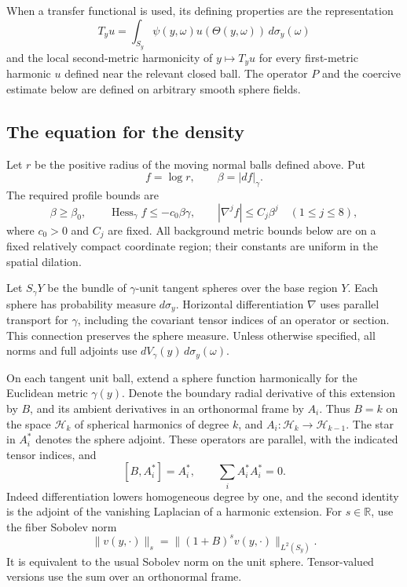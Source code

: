 \documentclass[11pt,a4paper]{article}
\numberwithin{equation}{section}
\begin{document}
When a transfer functional is used, its defining properties are the
representation
\[
 T_yu=\int_{S_y}\psi(y,\omega)u(\Theta(y,\omega))\,d\sigma_y(\omega)
\]
and the local second-metric harmonicity of $y\mapsto T_yu$ for every
first-metric harmonic $u$ defined near the relevant closed ball.
The operator $P$ and the coercive estimate below are defined on arbitrary
smooth sphere fields.

\subsection{The equation for the density}

Let $r$ be the positive radius of the moving normal balls defined above.  Put
\[
 f=\log r,\qquad \beta=|df|_\gamma.
\]
The required profile bounds are
\begin{equation}\label{angular:profile-bounds}
 \beta\ge\beta_0,\qquad
 \operatorname{Hess}_\gamma f\le-c_0\beta\gamma,
 \qquad |\nabla^j f|\le C_j\beta^j\quad(1\le j\le8),
\end{equation}
where $c_0>0$ and $C_j$ are fixed.  All background metric bounds
below are on a fixed relatively compact coordinate region; their constants
are uniform in the spatial dilation.

Let $S_\gamma Y$ be the bundle of $\gamma$-unit tangent spheres over the
base region $Y$.  Each sphere has probability measure $d\sigma_y$.
Horizontal differentiation $\nabla$ uses parallel transport for $\gamma$,
including the covariant tensor indices of an operator or section.  This
connection preserves the sphere measure.  Unless otherwise specified, all
norms and full adjoints use $dV_\gamma(y)\,d\sigma_y(\omega)$.

On each tangent unit ball, extend a sphere function harmonically for the
Euclidean metric $\gamma(y)$.  Denote the boundary radial derivative of
this extension by $B$, and its ambient derivatives in an orthonormal frame
by $A_i$.  Thus $B=k$ on the space $\mathcal H_k$ of spherical harmonics
of degree $k$, and $A_i:\mathcal H_k\to\mathcal H_{k-1}$.  The star in
$A_i^*$ denotes the sphere adjoint.  These operators are parallel, with
the indicated tensor indices, and
\begin{equation}\label{angular:elementary-identities}
 [B,A_i^*]=A_i^*,\qquad \sum_i A_i^*A_i^*=0.
\end{equation}
Indeed differentiation lowers homogeneous degree by one, and the second
identity is the adjoint of the vanishing Laplacian of a harmonic extension.
For $s\in\mathbb R$, use the fiber Sobolev norm
\[
 \|v(y,\cdot)\|_s=\|(1+B)^s v(y,\cdot)\|_{L^2(S_y)}.
\]
It is equivalent to the usual Sobolev norm on the unit sphere.  Tensor-valued
versions use the sum over an orthonormal frame.
\end{document}
